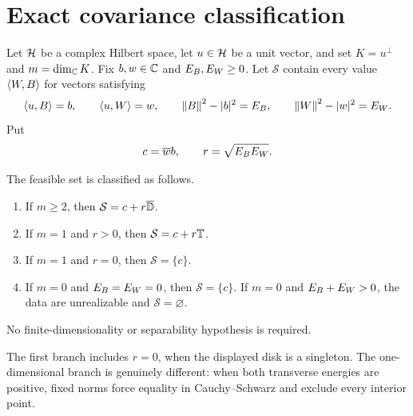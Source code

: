 \section{Exact covariance classification}

Let $\mathcal{H}$ be a complex Hilbert space, let $u\in\mathcal{H}$ be a unit vector, and set
$K=u^\perp$ and $m=\dim_{\mathbb{C}}K$.  Fix $b,w\in\mathbb{C}$ and
$E_B,E_W\ge0$.  Let $\mathcal S$ contain every value $\left\langle W,B\right\rangle$ for vectors
satisfying
\[
 \left\langle u,B\right\rangle=b,\qquad \left\langle u,W\right\rangle=w,
 \qquad \left\lVert B\right\rVert^2-|b|^2=E_B,
 \qquad \left\lVert W\right\rVert^2-|w|^2=E_W.
\]
Put
\[
 c=\overline w b,\qquad r=\sqrt{E_BE_W}.
\]

\begin{theorem}\label{thm:classification}
The feasible set is classified as follows.
\begin{enumerate}
\item If $m\ge2$, then $\mathcal S=c+r\overline{\mathbb{D}}$.
\item If $m=1$ and $r>0$, then $\mathcal S=c+r\mathbb{T}$.
\item If $m=1$ and $r=0$, then $\mathcal S=\{c\}$.
\item If $m=0$ and $E_B=E_W=0$, then $\mathcal S=\{c\}$.  If
      $m=0$ and $E_B+E_W>0$, the data are unrealizable and
      $\mathcal S=\varnothing$.
\end{enumerate}
No finite-dimensionality or separability hypothesis is required.
\end{theorem}

The first branch includes $r=0$, when the displayed disk is a singleton.  The
one-dimensional branch is genuinely different: when both transverse energies
are positive, fixed norms force equality in Cauchy--Schwarz and exclude every
interior point.
